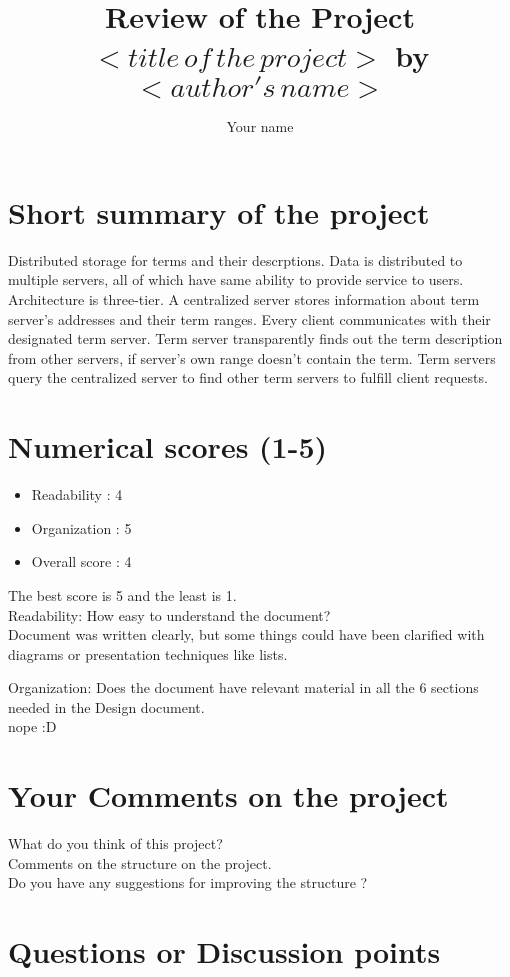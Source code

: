 \documentclass{article}
\begin{document}
\title{Review of the Project $<title\, of\, the \, project>$ by $<author's\,name>$ }
\author{Your name} 
\maketitle
\section{Short summary of the project}
Distributed storage for terms and their descrptions. Data is distributed to multiple servers, all of which have same ability to provide service to users. Architecture is three-tier. A centralized server stores information about term server's addresses and their term ranges.
Every client communicates with their designated term server. Term server transparently finds out the term description from other servers, if server's own range doesn't contain the term.
Term servers query the centralized server to find other term servers to fulfill client requests.
\section{Numerical scores (1-5)}

\begin{itemize}
\item Readability : 4
\item Organization : 5
\item Overall score : 4
\end{itemize}

\noindent The best score is 5 and the least is 1.\\
Readability: How easy to understand the document? \\
Document was written clearly, but some things could have been clarified with diagrams or presentation techniques like lists.

Organization: Does the document have relevant material in all the 6 sections needed in  the Design document.\\
nope :D

\section{Your Comments on the project}
What do you think of this project?\\
Comments on the structure on the project.\\
Do you have any suggestions for improving the structure ? \\ 


\section{Questions or Discussion points}
\end{document}
